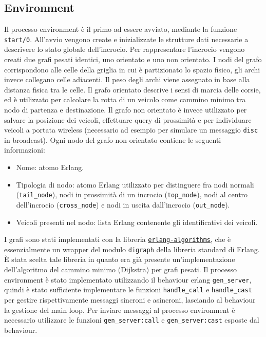\documentclass{memoir}
\begin{document}
\subsection{Environment}
Il processo environment è il primo ad essere avviato, mediante la funzione
\texttt{start/0}. All'avvio vengono create e inizializzate le strutture dati
necessarie a descrivere lo stato globale dell'incrocio. Per rappresentare
l'incrocio vengono creati due grafi pesati identici, uno orientato e uno non
orientato. I nodi del grafo corrispondono alle celle della griglia in cui è
partizionato lo spazio fisico, gli archi invece collegano celle adiacenti. Il
peso degli archi viene assegnato in base alla distanza fisica tra le celle. Il
grafo orientato descrive i sensi di marcia delle corsie, ed è utilizzato per
calcolare la rotta di un veicolo come cammino minimo tra nodo di partenza e
destinazione. Il grafo non orientato è invece utilizzato per salvare la
posizione dei veicoli, effettuare query di prossimità e per individuare veicoli
a portata wireless (necessario ad esempio per simulare un messaggio
\texttt{disc} in broadcast). Ogni nodo del grafo non orientato contiene le
seguenti informazioni:
\begin{itemize}
\item Nome: atomo Erlang.
\item Tipologia di nodo: atomo Erlang utilizzato per distinguere fra nodi
  normali (\texttt{tail\_node}), nodi in prossimità di un incrocio
  (\texttt{top\_node}), nodi al centro dell'incrocio (\texttt{cross\_node}) e
  nodi in uscita dall'incrocio (\texttt{out\_node}).
\item Veicoli presenti nel nodo: lista Erlang contenente gli identificativi dei
  veicoli.
\end{itemize}
I grafi sono stati implementati con la libreria
\href{https://github.com/aggelgian/erlang-algorithms}{\texttt{erlang-algorithms}},
che è essenzialmente un wrapper del modulo \texttt{digraph} della libreria
standard di Erlang. È stata scelta tale libreria in quanto era già presente
un'implementazione dell'algoritmo del cammino minimo (Dijkstra) per grafi
pesati. Il processo environment è stato implementato utilizzando il behaviour
erlang \texttt{gen\_server}, quindi è stato sufficiente implementare le funzioni
\texttt{handle\_call} e \texttt{handle\_cast} per gestire rispettivamente
messaggi sincroni e asincroni, lasciando al behaviour la gestione del main loop.
Per inviare messaggi al processo environment è necessario utilizzare le funzioni
\texttt{gen\_server:call} e \texttt{gen\_server:cast} esposte dal behaviour.
\end{document}
